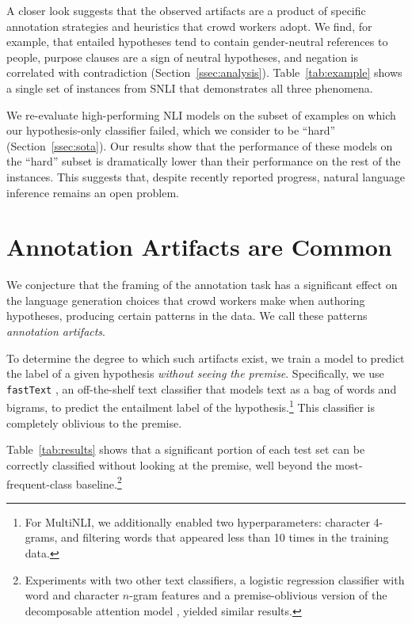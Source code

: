 A closer look suggests that the observed artifacts are a product of specific annotation strategies and heuristics that crowd workers adopt. We find, for example, that entailed hypotheses tend to contain gender-neutral references to people, purpose clauses are a sign of neutral hypotheses, and negation is correlated with contradiction (Section~\ref{ssec:analysis}). 
Table~\ref{tab:example} shows a single set of instances from SNLI that demonstrates all three phenomena.

We re-evaluate high-performing NLI models on the subset of examples on which our hypothesis-only classifier failed, which we consider to be ``hard'' (Section~\ref{ssec:sota}). 
Our results show that the performance of these models on the ``hard'' subset is dramatically lower than their performance on the rest of the instances. This suggests that, despite recently reported progress, natural language inference remains an open problem.

\section{Annotation Artifacts are Common}
\label{ssec:artifacts}

We conjecture that the framing of the annotation task has a significant effect on the language generation choices that crowd workers make when authoring hypotheses, producing certain patterns in the data. We call these patterns \textit{annotation artifacts}.

To determine the degree to which such artifacts exist, we train a model to predict the label of a given hypothesis \textit{without seeing the premise}. Specifically, we use \texttt{fastText} \cite{Joulin:2017}, an off-the-shelf text classifier that models text as a bag of words and bigrams, to predict the entailment label of the hypothesis.\footnote{For MultiNLI, we additionally enabled two hyperparameters: character 4-grams, and filtering words that appeared less than 10 times in the training data.} This classifier is completely oblivious to the premise.

Table~\ref{tab:results} shows that a significant portion of each test set can be correctly classified without looking at the premise, well beyond the most-frequent-class baseline.\footnote{Experiments with two other text classifiers, a logistic regression classifier with word and character $n$-gram features and a premise-oblivious version of the decomposable attention model \cite{Parikh:2016}, yielded similar results.}

